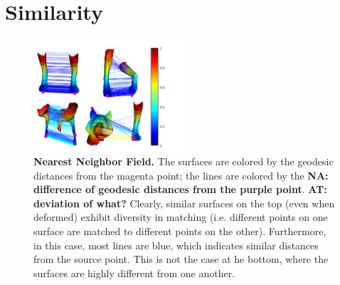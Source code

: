 \documentclass[10pt,twocolumn,letterpaper]{article}
\newcommand{\colornote}[3]{{\color{#1}\bf{#2: #3}\normalfont}}
\newcommand{\colornote}[3]{}
\newcommand {\ayellet}[1]{\colornote{blue}{AT}{#1}}
\newcommand {\nadav}[1]{\colornote{red}{NA}{#1}}
\begin{document}

\section{Similarity}
\label{sec:similarity}
\begin{figure}[htb]
	\includegraphics[width=0.5\textwidth]{figures/DDIS2.png}
	\caption{{\bf Nearest Neighbor Field.} 
		The surfaces are colored by the geodesic distances from the magenta point; the lines are colored by the \nadav{difference of geodesic distances from the purple point}. \ayellet{deviation of what?} 
		Clearly, similar surfaces on the top (even when deformed) exhibit diversity in matching (i.e. different points on one surface are matched to different points on the other).
		Furthermore, in this case, most lines are blue, which indicates similar distances from the source point.
		This is not the case at he bottom, where the surfaces are highly different from one another.
		}
		\label{fig:NNF}
\end{figure}
\end{document}
